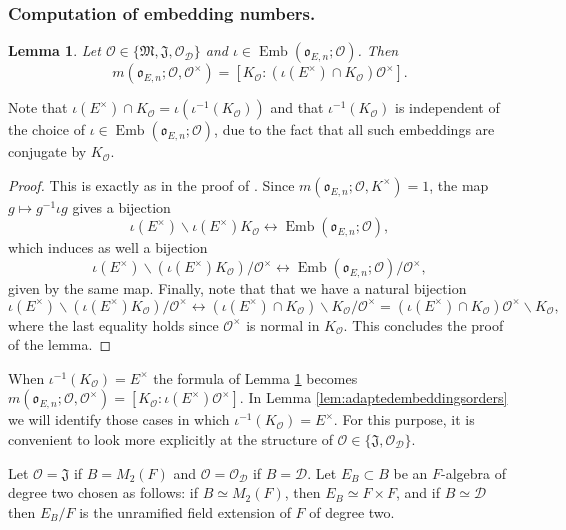 \documentclass{article}
\newtheorem{lem}{Lemma}[section]
\theoremstyle{named}
\newcommand{\D}{\mathcal{D}}
\newcommand{\M}{\mathfrak{M}}
\newcommand{\J}{\mathfrak{J}}
\renewcommand{\O}{\mathcal{O}}
\renewcommand{\o}{\mathfrak{o}}
\DeclareMathOperator{\Emb}{Emb}
\begin{document}
\subsubsection{Computation of embedding numbers.}
\begin{lem}\label{lem:optimalembeddingsOtimes}
Let $\O \in \{\M, \J, \O_\D\}$ and $\iota \in \Emb(\o_{E, n}; \O)$. Then 
\begin{equation*}
m(\o_{E, n}; \O, \O^\times) = [K_\O: (\iota(E^\times) \cap K_\O)\O^\times].    
\end{equation*}
\end{lem}
Note that $\iota(E^\times) \cap K_\O = \iota(\iota^{-1}(K_\O))$ and that $\iota^{-1}(K_\O)$ is independent of the choice of $\iota \in \Emb(\o_{E, n}; \O)$, due to the fact that all such embeddings are conjugate by $K_\O$.
\begin{proof}
This is exactly as in the proof of \cite[Lemma 30.3.14]{voight}. Since $m(\o_{E, n}; \O, K^\times) = 1$, the map $g \mapsto g^{-1}\iota g$ gives a bijection 
\begin{equation*}
    \iota(E^\times)\backslash \iota(E^\times)K_\O \longleftrightarrow \Emb(\o_{E, n}; \O),
\end{equation*}
which induces as well a bijection
\begin{equation*}
    \iota(E^\times)\backslash (\iota(E^\times)K_\O)/\O^\times \longleftrightarrow \Emb(\o_{E, n}; \O)/\O^\times,
\end{equation*}
given by the same map. 
Finally, note that that we have a natural bijection
\begin{equation*}
    \iota(E^\times)\backslash (\iota(E^\times)K_\O)/\O^\times \longleftrightarrow (\iota(E^\times) \cap K_\O)\backslash K_\O/\O^\times = (\iota(E^\times) \cap K_\O)\O^\times\backslash K_\O,
\end{equation*}
where the last equality holds since $\O^\times$ is normal in $K_\O$. This concludes the proof of the lemma.
\end{proof}

When $\iota^{-1}(K_\O) = E^\times$ the formula of  Lemma \ref{lem:optimalembeddingsOtimes} becomes $m(\o_{E, n}; \O, \O^\times) = [K_\O: \iota(E^\times)\O^\times]$. In Lemma \ref{lem:adaptedembeddingsorders} we will identify those cases in which $\iota^{-1}(K_\O) = E^\times$. For this purpose, it is convenient to look more explicitly at the structure of $\O \in \{\J, \O_\D\}$. 

Let $\O = \J$ if $B = M_2(F)$ and $\O = \O_\D$ if $B = \D$. Let $E_B \subset B$ be an $F$-algebra of degree two chosen as follows: if $B  \simeq M_2(F)$, then $E_B \simeq F \times F$, and if $B \simeq \D$ then $E_B/F$ is the unramified field extension of $F$ of degree two. 
\end{document}
